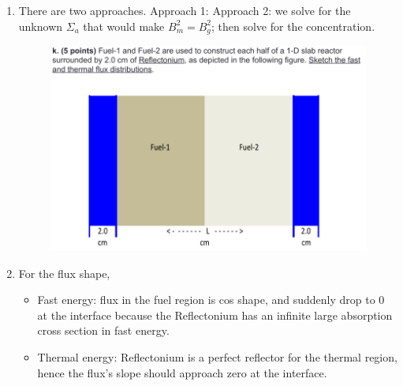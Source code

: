 \documentclass{school-22.211-notes}
\begin{document}
\begin{enumerate}
\begin{enumerate}
\item There are two approaches. Approach 1: 
  Approach 2: we solve for the unknown $\Sigma_a$ that would make $B_m^2 = B_g^2$; then solve for the concentration. 

\clearpage
\begin{figure}[ht]
  \centering
  \includegraphics[width=6in]{images/qual/quiz-4.png}  
\end{figure}
\item For the flux shape, 
  \begin{itemize}
    \item Fast energy: flux in the fuel region is cos shape, and suddenly drop to 0 at the interface because the Reflectonium has an infinite large absorption cross section in fast energy. 
    \item Thermal energy: Reflectonium is a perfect reflector for the thermal region, hence the flux's slope should approach zero at the interface. 
  \end{itemize}
\end{enumerate}



\end{enumerate}
\end{document}
